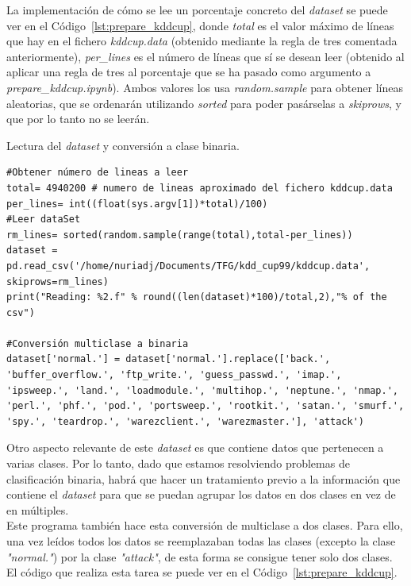 \documentclass[a4paper, 12pt]{book}
\begin{document}
La implementación de cómo se lee un porcentaje concreto del \textit{dataset} se puede ver en el Código~\ref{lst:prepare_kddcup}, donde \textit{total} es el valor máximo de líneas que hay en el fichero \textit{kddcup.data} (obtenido mediante la regla de tres comentada anteriormente), \textit{per\_lines} es el número de líneas que sí se desean leer (obtenido al aplicar una regla de tres al porcentaje que se ha pasado como argumento a \textit{prepare\_kddcup.ipynb}). Ambos valores los usa \textit{random.sample} para obtener líneas aleatorias, que se ordenarán utilizando \textit{sorted} para poder pasárselas a \textit{skiprows}, y que por lo tanto no se leerán.

\begin{listing}[]
    \caption{Lectura del \textit{dataset} y conversión a clase binaria.}{}
    \label{lst:prepare_kddcup}
    \begin{verbatim}
#Obtener número de lineas a leer
total= 4940200 # numero de lineas aproximado del fichero kddcup.data
per_lines= int((float(sys.argv[1])*total)/100)
#Leer dataSet
rm_lines= sorted(random.sample(range(total),total-per_lines))
dataset = pd.read_csv('/home/nuriadj/Documents/TFG/kdd_cup99/kddcup.data', skiprows=rm_lines)
print("Reading: %2.f" % round((len(dataset)*100)/total,2),"% of the csv")

#Conversión multiclase a binaria
dataset['normal.'] = dataset['normal.'].replace(['back.', 'buffer_overflow.', 'ftp_write.', 'guess_passwd.', 'imap.', 'ipsweep.', 'land.', 'loadmodule.', 'multihop.', 'neptune.', 'nmap.', 'perl.', 'phf.', 'pod.', 'portsweep.', 'rootkit.', 'satan.', 'smurf.', 'spy.', 'teardrop.', 'warezclient.', 'warezmaster.'], 'attack')
    \end{verbatim}
\end{listing}

Otro aspecto relevante de este \textit{dataset} es que contiene datos que pertenecen a varias clases. Por lo tanto, dado que estamos resolviendo problemas de clasificación binaria, habrá que hacer un tratamiento previo a la información que contiene el \textit{dataset} para que se puedan agrupar los datos en dos clases en vez de en múltiples.\\
Este programa también hace esta conversión de multiclase a dos clases. Para ello, una vez leídos todos los datos se reemplazaban todas las clases (excepto la clase \textit{"normal."}) por la clase \textit{"attack"}\cite{MulticlassToBinary}, de esta forma se consigue tener solo dos clases. El código que realiza esta tarea se puede ver en el Código~\ref{lst:prepare_kddcup}.
\end{document}
